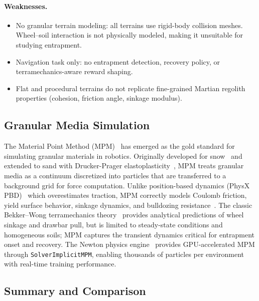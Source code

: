 \documentclass[12pt,a4paper]{article}
\begin{document}
\paragraph{Weaknesses.}
\begin{itemize}
    \item No granular terrain modeling: all terrains use rigid-body collision meshes. Wheel--soil interaction is not physically modeled, making it unsuitable for studying entrapment.
    \item Navigation task only: no entrapment detection, recovery policy, or terramechanics-aware reward shaping.
    \item Flat and procedural terrains do not replicate fine-grained Martian regolith properties (cohesion, friction angle, sinkage modulus).
\end{itemize}


\subsection{Granular Media Simulation}

The Material Point Method (MPM)~\cite{sulsky1994particle} has emerged as the gold standard for simulating granular materials in robotics. Originally developed for snow~\cite{stomakhin2013snow} and extended to sand with Drucker-Prager elastoplasticity~\cite{klar2016sand}, MPM treats granular media as a continuum discretized into particles that are transferred to a background grid for force computation. Unlike position-based dynamics (PhysX PBD)~\cite{macklin2014pbd} which overestimates traction, MPM correctly models Coulomb friction, yield surface behavior, sinkage dynamics, and bulldozing resistance~\cite{baumgarten2019granular}. The classic Bekker--Wong terramechanics theory~\cite{bekker1960} provides analytical predictions of wheel sinkage and drawbar pull, but is limited to steady-state conditions and homogeneous soils; MPM captures the transient dynamics critical for entrapment onset and recovery. The Newton physics engine~\cite{newton} provides GPU-accelerated MPM through \texttt{SolverImplicitMPM}, enabling thousands of particles per environment with real-time training performance.


\subsection{Summary and Comparison}
\end{document}
